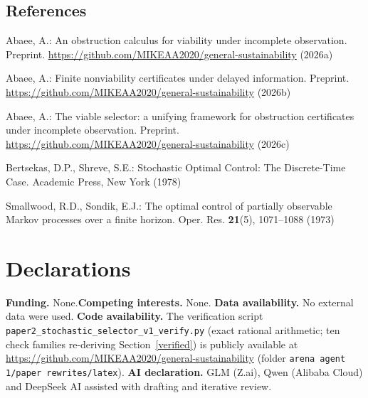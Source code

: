 \documentclass[10pt,twocolumn]{article}
\theoremstyle{definition}
\begin{document}
\subsection{References}\label{references}
{\footnotesize

Abaee, A.: An obstruction calculus for viability under incomplete
observation. Preprint.
\url{https://github.com/MIKEAA2020/general-sustainability} (2026a)

Abaee, A.: Finite nonviability certificates under delayed information.
Preprint. \url{https://github.com/MIKEAA2020/general-sustainability} (2026b)

Abaee, A.: The viable selector: a unifying framework for obstruction
certificates under incomplete observation. Preprint.
\url{https://github.com/MIKEAA2020/general-sustainability} (2026c)

Bertsekas, D.P., Shreve, S.E.: Stochastic Optimal Control: The Discrete-Time
Case. Academic Press, New York (1978)

Smallwood, R.D., Sondik, E.J.: The optimal control of partially observable
Markov processes over a finite horizon. Oper. Res. \textbf{21}(5),
1071--1088 (1973)

}

\section*{Declarations}

\textbf{Funding.} None.\quad \textbf{Competing interests.} None.\quad
\textbf{Data availability.} No external data were used.\quad
\textbf{Code availability.} The verification script
\texttt{paper2\_stochastic\_selector\_v1\_verify.py} (exact rational
arithmetic; ten check families re-deriving Section~\ref{verified}) is
publicly available at
\url{https://github.com/MIKEAA2020/general-sustainability} (folder
\texttt{arena agent 1/paper rewrites/latex}).\quad
\textbf{AI declaration.} GLM (Z.ai), Qwen (Alibaba Cloud) and DeepSeek AI
assisted with drafting and iterative review.
\end{document}
